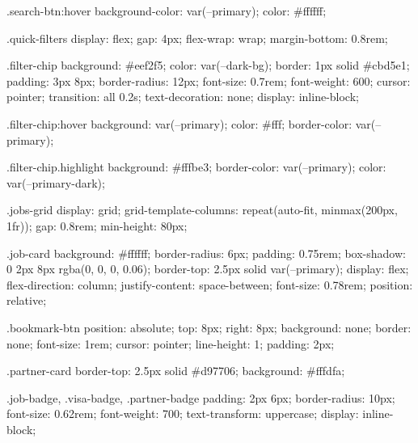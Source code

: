         .search-btn:hover {
            background-color: var(--primary);
            color: #ffffff;
        }

        .quick-filters {
            display: flex;
            gap: 4px;
            flex-wrap: wrap;
            margin-bottom: 0.8rem;
        }

        .filter-chip {
            background: #eef2f5;
            color: var(--dark-bg);
            border: 1px solid #cbd5e1;
            padding: 3px 8px;
            border-radius: 12px;
            font-size: 0.7rem;
            font-weight: 600;
            cursor: pointer;
            transition: all 0.2s;
            text-decoration: none;
            display: inline-block;
        }

        .filter-chip:hover {
            background: var(--primary);
            color: #fff;
            border-color: var(--primary);
        }

        .filter-chip.highlight {
            background: #fffbe3;
            border-color: var(--primary);
            color: var(--primary-dark);
        }

        .jobs-grid {
            display: grid;
            grid-template-columns: repeat(auto-fit, minmax(200px, 1fr));
            gap: 0.8rem;
            min-height: 80px;
        }

        .job-card {
            background: #ffffff;
            border-radius: 6px;
            padding: 0.75rem;
            box-shadow: 0 2px 8px rgba(0, 0, 0, 0.06);
            border-top: 2.5px solid var(--primary);
            display: flex;
            flex-direction: column;
            justify-content: space-between;
            font-size: 0.78rem;
            position: relative;
        }

        .bookmark-btn {
            position: absolute;
            top: 8px;
            right: 8px;
            background: none;
            border: none;
            font-size: 1rem;
            cursor: pointer;
            line-height: 1;
            padding: 2px;
        }

        .partner-card {
            border-top: 2.5px solid #d97706;
            background: #fffdfa;
        }

        .job-badge,
        .visa-badge,
        .partner-badge {
            padding: 2px 6px;
            border-radius: 10px;
            font-size: 0.62rem;
            font-weight: 700;
            text-transform: uppercase;
            display: inline-block;
        }


